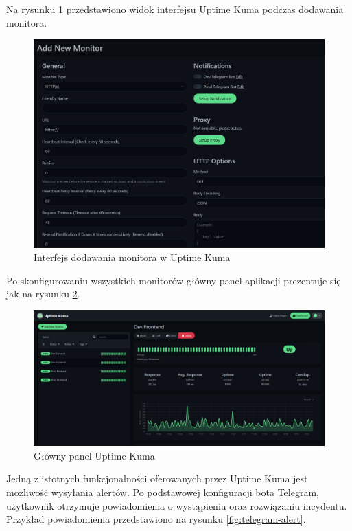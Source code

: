 \documentclass{article}
\begin{document}
Na rysunku \ref{fig:add-monitor} przedstawiono widok interfejsu Uptime Kuma podczas dodawania monitora.

\begin{figure}[H]
    \centering
    \includegraphics[width=1\linewidth]{uptimeKumaDodawanieMonitora.png}
    \caption{Interfejs dodawania monitora w Uptime Kuma}
    \label{fig:add-monitor}
\end{figure}

Po skonfigurowaniu wszystkich monitorów główny panel aplikacji prezentuje się jak na rysunku \ref{fig:dashboard}.

\begin{figure}[H]
    \centering
    \includegraphics[width=1\linewidth]{uptimeKumaDashboard.png}
    \caption{Główny panel Uptime Kuma}
    \label{fig:dashboard}
\end{figure}


Jedną z istotnych funkcjonalności oferowanych przez Uptime Kuma jest możliwość wysyłania alertów. Po podstawowej konfiguracji bota Telegram, użytkownik otrzymuje powiadomienia o wystąpieniu oraz rozwiązaniu incydentu. Przykład powiadomienia przedstawiono na rysunku \ref{fig:telegram-alert}.
\end{document}
